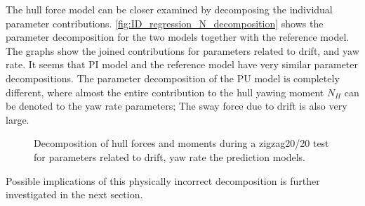 The hull force model can be closer examined by decomposing the individual parameter contributions. \autoref{fig:ID_regression_N_decomposition} shows the parameter decomposition for the two models together with the reference model. The graphs show the joined contributions for parameters related to drift, and yaw rate. It seems that PI model and the reference model have very similar parameter decompositions.
The parameter decomposition of the PU model is completely different, where almost the entire contribution to the hull yawing moment $N_H$ can be denoted to the yaw rate parameters; The sway force due to drift is also very large.  
\begin{figure}[h]
    \begin{center}
        
        \caption{Decomposition of hull forces and moments during a zigzag20/20 test for parameters related to drift, yaw rate the prediction models.}
        \label{fig:ID_regression_N_decomposition}
    \end{center}
\end{figure}
Possible implications of this physically incorrect decomposition is further investigated in the next section.